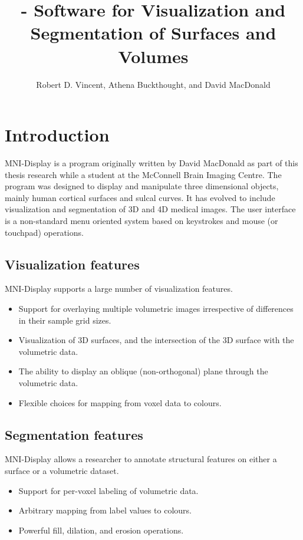 \documentclass[11pt,letterpaper]{article}
\title{{\bf \display} - Software for Visualization and Segmentation of Surfaces and Volumes}
\author{Robert D. Vincent, Athena Buckthought, and David MacDonald}
\newcommand{\display}{\mbox{MNI-Display}}
\begin{document}
\maketitle

\setcounter{tocdepth}{2}
\tableofcontents

\newpage

\section{Introduction}

\display{} is a program originally written by David MacDonald as part of
this thesis research while a student at the McConnell Brain Imaging
Centre. The program was designed to display and manipulate three
dimensional objects, mainly human cortical surfaces and sulcal
curves. It has evolved to include visualization and segmentation of 3D
and 4D medical images. The user interface is a non-standard menu
oriented system based on keystrokes and mouse (or touchpad) operations.

\subsection{Visualization features}
\display{} supports a large number of visualization features.
\begin{itemize}
\item Support for overlaying multiple volumetric images irrespective of differences in their sample grid sizes.
\item Visualization of 3D surfaces, and the intersection of the 3D surface with the volumetric data.
\item The ability to display an oblique (non-orthogonal) plane through the volumetric data.
\item Flexible choices for mapping from voxel data to colours.
\end{itemize}

\subsection{Segmentation features}
\display{} allows a researcher to annotate structural features on either a surface or a volumetric dataset.
\begin{itemize}
\item Support for per-voxel labeling of volumetric data.
\item Arbitrary mapping from label values to colours.
\item Powerful fill, dilation, and erosion operations.
\end{itemize}
\end{document}
